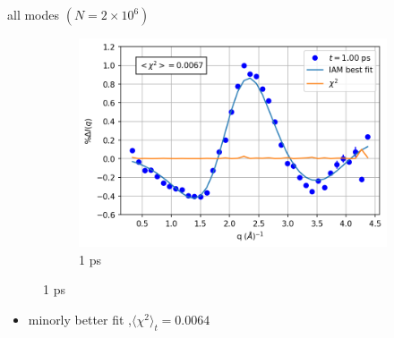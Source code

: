 \documentclass{beamer}
\newcommand\w{0.32}
\begin{document}
\begin{frame}{all modes $(N= 2\times10^6)$}
\begin{figure}
\begin{subfigure}[b]{\w\textwidth}
			\includegraphics[width=\textwidth]{figures/1000000_allmodes_1.00.png}
			\caption{1 ps}
		\end{subfigure}
	\end{figure}
	\begin{itemize}
		\item minorly better fit ,$\langle\chi^2\rangle_t = 0.0064$
	\end{itemize}
\end{frame}
\end{document}
